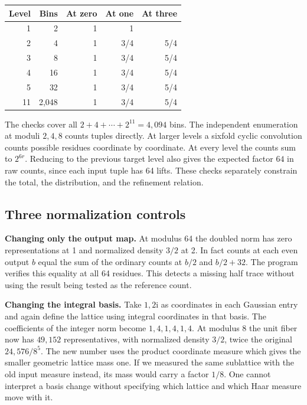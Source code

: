 \documentclass[12pt,letterpaper]{article}
\begin{document}
\begin{center}\small\begin{tabular}{rrrrr}\toprule Level & Bins & At zero & At one & At three\\\midrule
1 & 2 & 1 & 1 & \textemdash{}\\
2 & 4 & 1 & 3/4 & 5/4\\
3 & 8 & 1 & 3/4 & 5/4\\
4 & 16 & 1 & 3/4 & 5/4\\
5 & 32 & 1 & 3/4 & 5/4\\
11 & 2,048 & 1 & 3/4 & 5/4\\\bottomrule\end{tabular}\end{center}
The checks cover all \(2+4+\cdots+2^{11}=4{,}094\) bins. The independent enumeration at moduli \(2,4,8\) counts tuples directly. At larger levels a sixfold cyclic convolution counts possible residues coordinate by coordinate. At every level the counts sum to \(2^{6r}\). Reducing to the previous target level also gives the expected factor \(64\) in raw counts, since each input tuple has 64 lifts. These checks separately constrain the total, the distribution, and the refinement relation.

\clearpage\subsection{Three normalization controls}
\textbf{Changing only the output map.} At modulus 64 the doubled norm has zero representations at 1 and normalized density \(3/2\) at 2. In fact counts at each even output \(b\) equal the sum of the ordinary counts at \(b/2\) and \(b/2+32\). The program verifies this equality at all 64 residues. This detects a missing half trace without using the result being tested as the reference count.

\textbf{Changing the integral basis.} Take \(1,2\mathrm i\) as coordinates in each Gaussian entry and again define the lattice using integral coordinates in that basis. The coefficients of the integer norm become \(1,4,1,4,1,4\). At modulus 8 the unit fiber now has \(49{,}152\) representatives, with normalized density \(3/2\), twice the original \(24{,}576/8^5\). The new number uses the product coordinate measure which gives the smaller geometric lattice mass one. If we measured the same sublattice with the old input measure instead, its mass would carry a factor \(1/8\). One cannot interpret a basis change without specifying which lattice and which Haar measure move with it.
\end{document}
